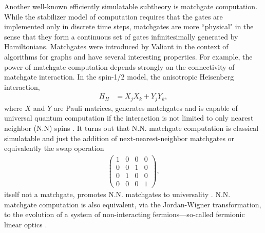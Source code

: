 %	
%	

Another well-known efficiently simulatable subtheory is matchgate computation. While the stabilizer model of computation requires that the gates are implemented only in discrete time steps, matchgates are more ``physical" in the sense that they form a continuous set of gates infinitesimally generated by Hamiltonians. Matchgates were introduced by Valiant \cite{valiant_quantum_2002,valiant_holographic_2008} in the context of algorithms for graphs and have several interesting properties. For example, the power of matchgate computation depends strongly on the connectivity of matchgate interaction. In the spin-1/2 model, the anisotropic Heisenberg interaction,
\begin{align}
	H_H &= X_jX_k + Y_jY_k,
\end{align}
where $X$ and $Y$ are Pauli matrices,
generates matchgates and is capable of universal quantum computation if the interaction is not limited to only nearest neighbor (N.N) spins \cite{divincenzo_universal_2000,kempe_encoded_2001,kempe_exact_2002}. It turns out that N.N. matchgate computation is classical simulatable and just the addition of next-nearest-neighbor matchgates or equivalently the swap operation
\begin{align}
	\begin{pmatrix}
		1 & 0 & 0 & 0 \\
		0 & 0 & 1 & 0 \\
		0 & 1 & 0 & 0 \\
		0 & 0 & 0 & 1
	\end{pmatrix},
\end{align}
itself not a matchgate, promotes N.N. matchgates to universality \cite{jozsa_matchgates_2008}. N.N. matchgate computation is also equivalent, via the Jordan-Wigner transformation, to the evolution of a system of non-interacting fermions---so-called fermionic linear optics \cite{knill_fermionic_2001,terhal_classical_2002}.

